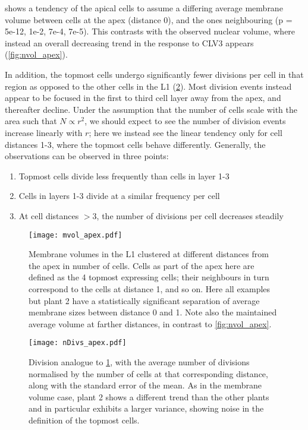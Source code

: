   shows a tendency of the apical cells to
 assume a differing average membrane volume between cells at the apex (distance
 0), and the
 ones neighbouring (p = 5e-12, 1e-2, 7e-4, 7e-5). This
 contrasts with the observed nuclear volume, where instead an overall decreasing
 trend in the response to CLV3 appears (\cref{fig:nvol_apex}).
 
 In addition, the topmost cells undergo significantly fewer divisions per cell in
 that region as opposed to the other cells in the L1 (\cref{fig:nDivs_apex}).
 Most division events instead appear to be focused in the first to third cell
 layer away from the apex, and thereafter decline. Under the assumption that the
 number of cells scale with the area such that $N \propto r^2$, we should expect
 to see the number of division events increase linearly with $r$; here we
 instead see the linear tendency only for cell distances 1-3, where the topmost cells
 behave differently. Generally, the observations can be observed in three
 points:
 \begin{enumerate}
   \item Topmost cells divide less frequently than cells in layer 1-3
   \item Cells in layers 1-3 divide at a similar frequency per cell
   \item At cell distances $>3$, the number of divisions per cell decreases
     steadily
 \end{enumerate}


 \begin{figure}[H]
   \centering
   \texttt{[image: mvol\_apex.pdf]}
   \caption[Membrane volume clustering]{Membrane volumes in the L1 clustered at different distances from the apex in
     number of cells. Cells as part of the apex here are defined as the 4
     topmost expressing cells; their neighbours in turn correspond to the cells
     at distance 1, and so on. Here all examples but plant 2 have a
     statistically significant separation of average membrane sizes between
     distance
     0 and  1. Note also the maintained average volume at farther distances, in
     contrast to \cref{fig:nvol_apex}.}
  \label{fig:mvol_apex}
\end{figure}

\begin{figure}[H]
   \centering
   \texttt{[image: nDivs\_apex.pdf]}
   \caption[Division rate clustering]{Division analogue to \cref{fig:mvol_apex}, with the average number of
     divisions normalised by the number of cells at that corresponding
     distance, along with the standard error of the mean. As in the membrane
     volume case, plant 2 shows a different trend  
     than the other plants and in particular exhibits a larger variance,
     showing noise in the definition of the topmost cells. 
   }  
   \label{fig:nDivs_apex}
\end{figure}

